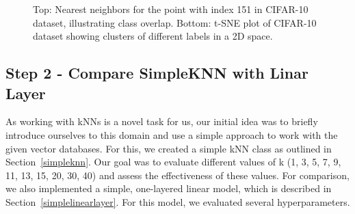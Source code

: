 \documentclass[a4paper]{article}
\begin{document}
\begin{figure} [ht]
    \centering
    \begin{minipage}{1\linewidth}
        \centering
    \end{minipage}\hfill
    \begin{minipage}{1\linewidth}
        \centering
    \end{minipage}
    \caption{Top: Nearest neighbors for the point with index 151 in CIFAR-10 dataset, illustrating class overlap. Bottom: t-SNE plot of CIFAR-10 dataset showing clusters of different labels in a 2D space.}
    \label{fig:cifar10_combined}
\end{figure}

\subsection{Step 2 - Compare SimpleKNN with Linar Layer}
As working with kNNs is a novel task for us, our initial idea was to briefly introduce ourselves to this domain and use a simple approach to work with the given vector databases. For this, we created a simple kNN class as outlined in Section~\ref{simpleknn}. Our goal was to evaluate different values of k (1, 3, 5, 7, 9, 11, 13, 15, 20, 30, 40) and assess the effectiveness of these values. For comparison, we also implemented a simple, one-layered linear model, which is described in Section~\ref{simplelinearlayer}. For this model, we evaluated several hyperparameters.
\end{document}
